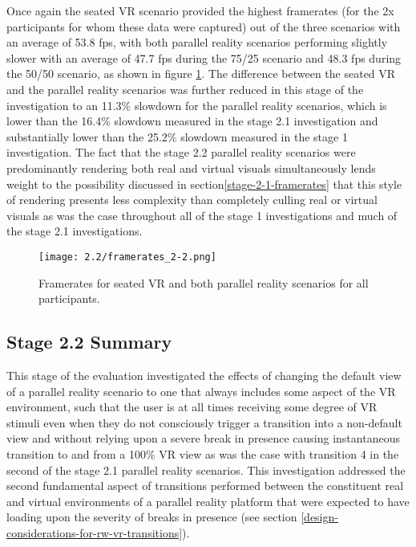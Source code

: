 Once again the seated VR scenario provided the highest framerates (for the 2x participants for whom these data were captured) out of the three scenarios with an average of 53.8 fps, with both parallel reality scenarios performing slightly slower with an average of 47.7 fps during the 75/25 scenario and 48.3 fps during the 50/50 scenario, as shown in figure \ref{framerates_2-2.png}. The difference between the seated VR and the parallel reality scenarios was further reduced in this stage of the investigation to an 11.3\% slowdown for the parallel reality scenarios, which is lower than the 16.4\% slowdown measured in the stage 2.1 investigation and substantially lower than the 25.2\% slowdown measured in the stage 1 investigation. The fact that the stage 2.2 parallel reality scenarios were predominantly rendering both real and virtual visuals simultaneously lends weight to the possibility discussed in section\ref{stage-2-1-framerates} that this style of rendering presents less complexity than completely culling real or virtual visuals as was the case throughout all of the stage 1 investigations and much of the stage 2.1 investigations.

\begin{figure}[h]
	\begin{center}
	\texttt{[image: 2.2/framerates\_2-2.png]}
	\caption{Framerates for seated VR and both parallel reality scenarios for all participants.}
	\label{framerates_2-2.png}
	\end{center}
\end{figure}


\subsection{Stage 2.2 Summary}

This stage of the evaluation investigated the effects of changing the default view of a parallel reality scenario to one that always includes some aspect of the VR environment, such that the user is at all times receiving some degree of VR stimuli even when they do not consciously trigger a transition into a non-default view and without relying upon a severe break in presence causing instantaneous transition to and from a 100\% VR view as was the case with transition 4 in the second of the stage 2.1 parallel reality scenarios. This investigation addressed the second fundamental aspect of transitions performed between the constituent real and virtual environments of a parallel reality platform that were expected to have loading upon the severity of breaks in presence (see section \ref{design-considerations-for-rw-vr-transitions}).

